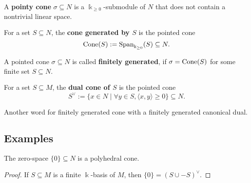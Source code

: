 \begin{definition}
  \label{pointy-cone}
  A {\bf pointy cone} \( \sigma \subseteq N \) is a \( \Bbbk_{\geq 0}
  \)-submodule of \( N \) that does not contain a nontrivial linear space.
\end{definition}

\begin{definition}
  \label{cone-span}
  For a set \( S \subseteq N \), the {\bf cone generated by \( S \)}
  is the pointed cone
  \[
      \operatorname{Cone}(S) := \operatorname{Span}_{\Bbbk_{\geq 0}}(S) \subseteq N.
  \]
\end{definition}

\begin{definition}
  \label{cone-finitely-generated}
  A pointed cone \( \sigma \subseteq N \) is called {\bf finitely
  generated}, if \( \sigma = \operatorname{Cone}(S) \) for some finite set \( S
  \subseteq N \).
\end{definition}

\begin{definition}
  \label{dual-cone}
  For a set \( S \subseteq M \), the {\bf dual cone of \( S \)} is
  the pointed cone
  \[
      S^\vee := \{x \in N \mid \forall y \in S, \langle x, y \rangle
      \geq 0 \} \subseteq N.
  \]
\end{definition}

\begin{definition}
  \label{polyhedral-cone}
  Another word for finitely generated cone with a finitely generated canonical dual.
\end{definition}

\subsection{Examples}

\begin{proposition}
  \label{bot-polyhedral}
  The zero-space \( \{0\} \subseteq N \) is a polyhedral cone.
\end{proposition}
\begin{proof}
  \uses{}
  If \( S \subseteq M \) is a finite \( \Bbbk \)-basis of \( M \),
  then \( \{0\} = (S \cup -S)^\vee \).
\end{proof}

